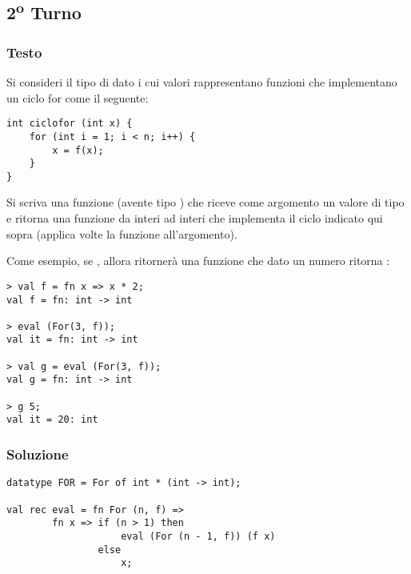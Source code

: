 \subsection{2\textsuperscript{o} Turno}

\subsubsection{Testo}

Si consideri il tipo di dato  i cui valori  rappresentano funzioni che implementano un ciclo for come il seguente:

\begin{lstlisting}[style = SML, caption = {Esempio di ciclo for in \sml{C}}]
int ciclofor (int x) {
	for (int i = 1; i < n; i++) {
		x = f(x);
	}
}
\end{lstlisting}

Si scriva una funzione  (avente tipo ) che riceve come argomento un valore di tipo  e ritorna una funzione da interi ad interi che implementa il ciclo indicato qui sopra (applica  volte la funzione  all'argomento).

\medskip
Come esempio, se , allora  ritornerà una funzione che dato un numero  ritorna :

\begin{lstlisting}[style = SML]
> val f = fn x => x * 2;
val f = fn: int -> int

> eval (For(3, f));
val it = fn: int -> int

> val g = eval (For(3, f));
val g = fn: int -> int

> g 5;
val it = 20: int
\end{lstlisting}

\subsubsection{Soluzione}

\begin{lstlisting}[style = SML, caption = {definizione della funzione \sml{eval}}]
datatype FOR = For of int * (int -> int);

val rec eval = fn For (n, f) =>
		fn x => if (n > 1) then
					eval (For (n - 1, f)) (f x)
				else
					x;
\end{lstlisting}
